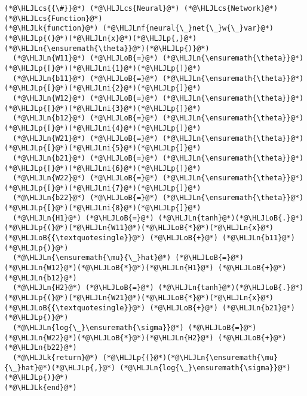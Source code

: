 \documentclass[12pt,a4paper]{article}
\newcommand{\HLJLk}[1]{\textcolor[RGB]{148,91,176}{\textbf{#1}}}
\newcommand{\HLJLn}[1]{#1}
\newcommand{\HLJLnf}[1]{\textcolor[RGB]{66,102,213}{#1}}
\newcommand{\HLJLni}[1]{\textcolor[RGB]{59,151,46}{#1}}
\newcommand{\HLJLoB}[1]{\textcolor[RGB]{102,102,102}{\textbf{#1}}}
\newcommand{\HLJLp}[1]{#1}
\newcommand{\HLJLcs}[1]{\textcolor[RGB]{153,153,119}{\textit{#1}}}
\begin{document}
\begin{lstlisting}
(*@\HLJLcs{{\#}}@*) (*@\HLJLcs{Neural}@*) (*@\HLJLcs{Network}@*) (*@\HLJLcs{Function}@*)
(*@\HLJLk{function}@*) (*@\HLJLnf{neural{\_}net{\_}w{\_}var}@*)(*@\HLJLp{(}@*)(*@\HLJLn{x}@*)(*@\HLJLp{,}@*)(*@\HLJLn{\ensuremath{\theta}}@*)(*@\HLJLp{)}@*)
  (*@\HLJLn{W11}@*) (*@\HLJLoB{=}@*) (*@\HLJLn{\ensuremath{\theta}}@*)(*@\HLJLp{[}@*)(*@\HLJLni{1}@*)(*@\HLJLp{]}@*)
  (*@\HLJLn{b11}@*) (*@\HLJLoB{=}@*) (*@\HLJLn{\ensuremath{\theta}}@*)(*@\HLJLp{[}@*)(*@\HLJLni{2}@*)(*@\HLJLp{]}@*)
  (*@\HLJLn{W12}@*) (*@\HLJLoB{=}@*) (*@\HLJLn{\ensuremath{\theta}}@*)(*@\HLJLp{[}@*)(*@\HLJLni{3}@*)(*@\HLJLp{]}@*)
  (*@\HLJLn{b12}@*) (*@\HLJLoB{=}@*) (*@\HLJLn{\ensuremath{\theta}}@*)(*@\HLJLp{[}@*)(*@\HLJLni{4}@*)(*@\HLJLp{]}@*)
  (*@\HLJLn{W21}@*) (*@\HLJLoB{=}@*) (*@\HLJLn{\ensuremath{\theta}}@*)(*@\HLJLp{[}@*)(*@\HLJLni{5}@*)(*@\HLJLp{]}@*)
  (*@\HLJLn{b21}@*) (*@\HLJLoB{=}@*) (*@\HLJLn{\ensuremath{\theta}}@*)(*@\HLJLp{[}@*)(*@\HLJLni{6}@*)(*@\HLJLp{]}@*)
  (*@\HLJLn{W22}@*) (*@\HLJLoB{=}@*) (*@\HLJLn{\ensuremath{\theta}}@*)(*@\HLJLp{[}@*)(*@\HLJLni{7}@*)(*@\HLJLp{]}@*)
  (*@\HLJLn{b22}@*) (*@\HLJLoB{=}@*) (*@\HLJLn{\ensuremath{\theta}}@*)(*@\HLJLp{[}@*)(*@\HLJLni{8}@*)(*@\HLJLp{]}@*)
  (*@\HLJLn{H1}@*) (*@\HLJLoB{=}@*) (*@\HLJLn{tanh}@*)(*@\HLJLoB{.}@*)(*@\HLJLp{(}@*)(*@\HLJLn{W11}@*)(*@\HLJLoB{*}@*)(*@\HLJLn{x}@*)(*@\HLJLoB{{\textquotesingle}}@*) (*@\HLJLoB{+}@*) (*@\HLJLn{b11}@*)(*@\HLJLp{)}@*)
  (*@\HLJLn{\ensuremath{\mu}{\_}hat}@*) (*@\HLJLoB{=}@*) (*@\HLJLn{W12}@*)(*@\HLJLoB{*}@*)(*@\HLJLn{H1}@*) (*@\HLJLoB{+}@*) (*@\HLJLn{b12}@*)
  (*@\HLJLn{H2}@*) (*@\HLJLoB{=}@*) (*@\HLJLn{tanh}@*)(*@\HLJLoB{.}@*)(*@\HLJLp{(}@*)(*@\HLJLn{W21}@*)(*@\HLJLoB{*}@*)(*@\HLJLn{x}@*)(*@\HLJLoB{{\textquotesingle}}@*) (*@\HLJLoB{+}@*) (*@\HLJLn{b21}@*)(*@\HLJLp{)}@*)
  (*@\HLJLn{log{\_}\ensuremath{\sigma}}@*) (*@\HLJLoB{=}@*) (*@\HLJLn{W22}@*)(*@\HLJLoB{*}@*)(*@\HLJLn{H2}@*) (*@\HLJLoB{+}@*) (*@\HLJLn{b22}@*)
  (*@\HLJLk{return}@*) (*@\HLJLp{(}@*)(*@\HLJLn{\ensuremath{\mu}{\_}hat}@*)(*@\HLJLp{,}@*) (*@\HLJLn{log{\_}\ensuremath{\sigma}}@*)(*@\HLJLp{)}@*)
(*@\HLJLk{end}@*)



\end{lstlisting}
\end{document}
